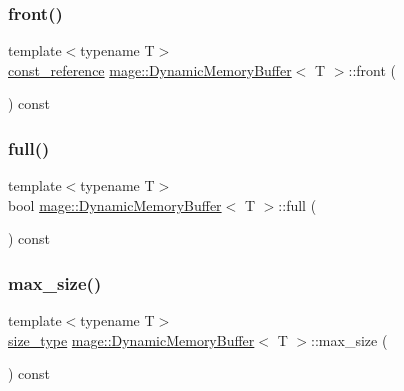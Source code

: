 \subsubsection{\texorpdfstring{front()}{front()}\hspace{0.1cm}{\footnotesize\ttfamily [2/2]}}
{\footnotesize\ttfamily template$<$typename T$>$ \\
\mbox{\hyperlink{classmage_1_1_dynamic_memory_buffer_aa454489303e19392c54044d3b3ae67ad}{const\+\_\+reference}} \mbox{\hyperlink{classmage_1_1_dynamic_memory_buffer}{mage\+::\+Dynamic\+Memory\+Buffer}}$<$ T $>$\+::front (\begin{DoxyParamCaption}{ }\end{DoxyParamCaption}) const\hspace{0.3cm}{\ttfamily [noexcept]}}

\mbox{\label{classmage_1_1_dynamic_memory_buffer_a8d4582966edb75250c2dea5917108d76}} 
\subsubsection{\texorpdfstring{full()}{full()}}
{\footnotesize\ttfamily template$<$typename T$>$ \\
bool \mbox{\hyperlink{classmage_1_1_dynamic_memory_buffer}{mage\+::\+Dynamic\+Memory\+Buffer}}$<$ T $>$\+::full (\begin{DoxyParamCaption}{ }\end{DoxyParamCaption}) const\hspace{0.3cm}{\ttfamily [noexcept]}}

\mbox{\label{classmage_1_1_dynamic_memory_buffer_ae7daa0e16fc5ac33817f2af79fa72fc9}} 
\subsubsection{\texorpdfstring{max\+\_\+size()}{max\_size()}}
{\footnotesize\ttfamily template$<$typename T$>$ \\
\mbox{\hyperlink{classmage_1_1_dynamic_memory_buffer_a45d02825da2b18fd7c24965ed5f46a30}{size\+\_\+type}} \mbox{\hyperlink{classmage_1_1_dynamic_memory_buffer}{mage\+::\+Dynamic\+Memory\+Buffer}}$<$ T $>$\+::max\+\_\+size (\begin{DoxyParamCaption}{ }\end{DoxyParamCaption}) const\hspace{0.3cm}{\ttfamily [noexcept]}}

